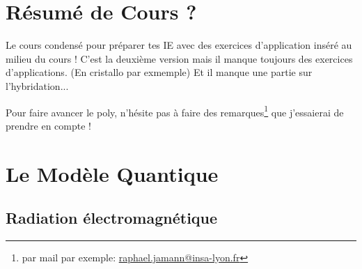 \documentclass{article}
\title{\getTitle}
\author{Raphaël Jamann}
\date{Janvier 2025}
\begin{document}
\maketitle

\thispagestyle{empty}

\vspace{3cm}
\begin{figure}[h]
    \centering
\end{figure}

\section*{Résumé de Cours ?}
Le cours condensé pour préparer tes IE avec des exercices d'application inséré au milieu du cours !
C'est la deuxième version mais il manque toujours des exercices d'applications. (En cristallo par exmemple) Et il manque une partie sur l'hybridation...

Pour faire avancer le poly, n'hésite pas à faire des remarques\footnote{par mail par exemple: \href{raphael.jamann@insa-lyon.fr}{raphael.jamann@insa-lyon.fr}} que j'essaierai de prendre en compte !


\newpage

\tableofcontents


\newpage

\section{Le Modèle Quantique}
\subsection{Radiation électromagnétique}
\end{document}
